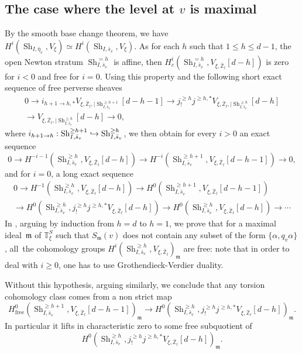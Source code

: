 \documentclass[11pt]{article}
\def\hto{\mathrel{\lhook\joinrel\to}}
\newcommand{\free}{\mathrm{free}}
\theoremstyle{plain}
\theoremstyle{definition}
\numberwithin{equation}{subsection}
\newcommand\Tm{{\mathbb T}}
\newcommand\Zm{{\mathbb Z}}
\DeclareMathOperator{\sh}{Sh}
\begin{document}
\subsection{The case where the level at $v$ is maximal}
\label{para-max}

By the smooth base change theorem, we have
$H^i(\sh_{I,\bar \eta_v}, V_\xi) \simeq H^i(\sh_{I,\bar s_v},V_\xi)$.
As for each $h$ such that $1 \leq h \leq d-1$, the open Newton stratum $\sh^{=h}_{I,\bar s_v}$ is affine,
then $H^i_c(\sh^{=h}_{I,\bar s_v},V_{\xi,\overline \Zm_l}[d-h])$ is zero for $i<0$ and free for $i=0$.
Using this property and the following short exact sequence
of free perverse sheaves
\begin{multline*}
0 \to i_{h+1 \to h,*} V_{\xi,\overline \Zm_l,|\sh_{I,\bar s_v}^{\geq h+1}}[d-h-1] \to
j^{\geq h}_! j^{\geq h,*} V_{\xi,\overline \Zm_l,|\sh^{\geq h}_{I,\bar s_v}}[d-h] \\ \to
V_{\xi,\overline \Zm_l,|\sh^{\geq h}_{I,\bar s_v}}[d-h] \to 0,
\end{multline*}
where $i_{h+1 \to h}: \sh_{I,\bar s_v}^{\geq h+1} \hto
\sh_{I,\bar s_v}^{\geq h}$,
we then obtain for every $i>0$ an exact sequence
\begin{equation} \label{eq-sec}
0 \to H^{-i-1}(\sh^{\geq h}_{I,\bar s_v},V_{\xi,\overline \Zm_l}[d-h]) \to
H^{-i}(\sh^{\geq h+1}_{I,\bar s_v},V_{\xi,\overline \Zm_l}[d-h-1]) \to 0,
\end{equation}
and for $i=0$, a long exact sequence
\begin{multline} \label{eq-sec0}
0 \to H^{-1}(\sh^{\geq h}_{I,\bar s_v},V_{\xi,\overline \Zm_l}[d-h]) \to
H^{0}(\sh^{\geq h+1}_{I,\bar s_v},V_{\xi,\overline \Zm_l}[d-h-1])\\
\to H^0(\sh^{\geq h}_{I,\bar s_v},j^{\geq h}_! j^{\geq h,*} V_{\xi,\overline \Zm_l}[d-h]) \to
H^{0}(\sh^{\geq h}_{I,\bar s_v},V_{\xi,\overline \Zm_l}[d-h]) \to \cdots
\end{multline}
In \cite{boyer-imj}, arguing by induction from $h=d$ to $h=1$, we prove that for a maximal
ideal~$\mathfrak m$ of $\Tm^S_{\xi}$ such that $S_{\mathfrak m}(v)$ does not contain any subset
of the form $\{\alpha,q_v \alpha\}$, all~the cohomology groups
$H^i(\sh_{I,\bar s_v}^{\geq h},V_{\xi,\overline \Zm_l})_{\mathfrak m}$ are free: note that in order
to deal with $i\geq 0$, one has to use Grothendieck-Verdier duality.

Without this hypothesis, arguing similarly, we conclude that any torsion cohomology class
comes from a non strict map
\begin{equation} \label{eq-map-strict-fini}
H^{0}_{\free}(\sh^{\geq h+1}_{I,\bar s_v},V_{\xi,\overline \Zm_l}[d-h-1])_{\mathfrak m} \to
H^0(\sh^{\geq h}_{I,\bar s_v},j^{\geq h}_! j^{\geq h,*} V_{\xi,\overline \Zm_l}[d-h])_{\mathfrak m}.
\end{equation}
In particular it lifts in characteristic zero to some free subquotient of
\[
H^0(\sh^{\geq h}_{I,\bar s_v},j^{\geq h}_! j^{\geq h,*} V_{\xi,\overline \Zm_l}[d-h])_{\mathfrak m}.
\]
\end{document}
